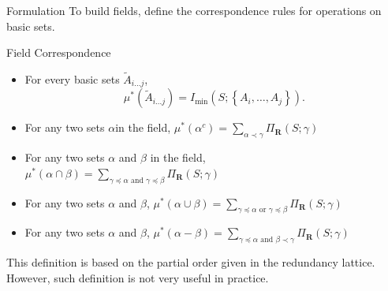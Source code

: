\begin{frame}{Formulation}
    To build fields, define the correspondence rules for operations on basic sets.
    \begin{block}{Field Correspondence}
        \begin{itemize}
            \item For every basic sets $\tilde{A}_{i\ldots j}$,
            \begin{equation}
                \mu^{*} \left(\tilde{A}_{i\ldots j}\right) = I_{\min}\left(S;\left\{A_i, \ldots, A_j\right\}\right).
                \label{eqn:intersectofbasic}
            \end{equation}
            \item For any two sets $\alpha$in the field, $\mu^{*} \left(\alpha^{c} \right) = \sum_{ \alpha \prec \gamma  } \Pi_{\mathbf{R}} (S;\gamma)$
            \item For any two sets $\alpha$ and $\beta$ in the field, $\mu^{*} \left(\alpha \cap \beta \right) = \sum_{\gamma \preceq \alpha \text{ and } \gamma \preceq \beta} \Pi_{\mathbf{R}} (S;\gamma)$
            \item For any two sets $\alpha$ and $\beta$, $\mu^{*} \left(\alpha \cup \beta \right) = \sum_{\gamma \preceq \alpha \text{ or } \gamma \preceq \beta} \Pi_{\mathbf{R}} (S;\gamma)$
            \item For any two sets $\alpha$ and $\beta$, $\mu^{*} \left(\alpha - \beta \right) = \sum_{\gamma \preceq \alpha \text{ and } \beta \prec \gamma} \Pi_{\mathbf{R}} (S;\gamma)$
        \end{itemize}
    \end{block}
    
    This definition is based on the partial order given in the redundancy lattice. However, such definition is not very useful in practice.
\end{frame}






